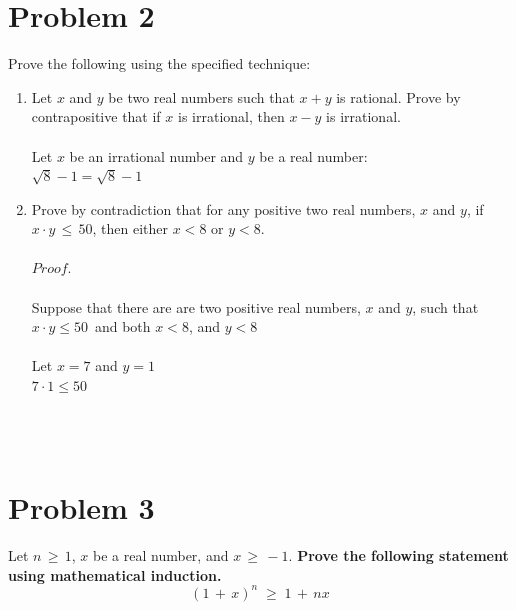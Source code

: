 \documentclass{amsart}
\theoremstyle{definition}
\theoremstyle{Exercise}
\theoremstyle{remark}
\theoremstyle{rule}
\numberwithin{equation}{section}
\begin{document}
  \section*{Problem 2}
  Prove the following using the specified technique:
  \begin{enumerate}[label=(\alph*)]
    \item Let $x$ and $y$ be two real numbers such that $x + y$ is rational. Prove by contrapositive that if $x$ is irrational, then $x - y$ is irrational.
          \\\\
Let $x$ be an irrational number and $y$ be a real number:\\
$\sqrt{8} - 1 = \sqrt{8} - 1$\\

\item Prove by contradiction that for any positive two real numbers, $x$ and $y$,
if $x\cdot y\, \leq \,50$, then either $x < 8$ or $y < 8$.
\\\\
$Proof.$\\\\
Suppose that there are are two positive real numbers, $x$ and $y$, such that\\
$x \cdot y \leq 50\,$ and both $x < 8$, and $y < 8$\\\\
Let $x = 7$ and $y = 1$\\
$7 \cdot 1 \leq 50$

\\\\
  \end{enumerate}
  \newpage
  \section*{Problem 3}
  Let $n\, \geq \, 1$, $x$ be a real number, and $x\, \geq\,-1$. {\bf Prove the following statement using mathematical induction.}
  \[(1\,+\,x)^n\;\geq\;1\,+\,nx\]
\end{document}
